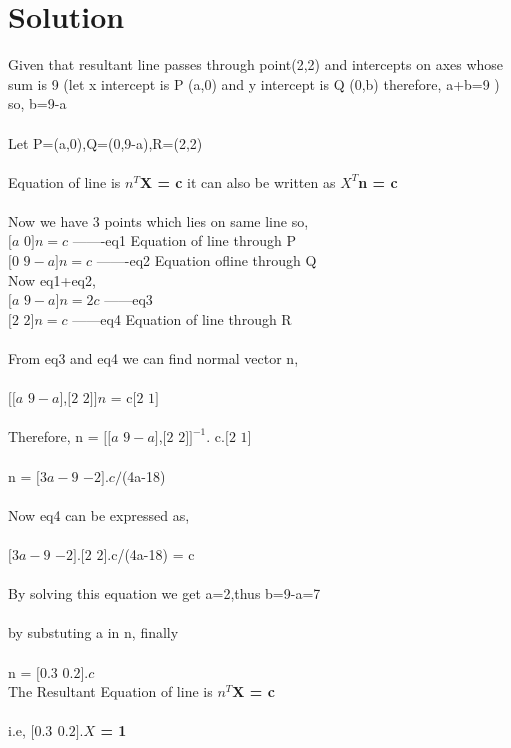 \documentclass[journal,12pt,twocolumn]{IEEEtran}
\begin{document}
\section{Solution}
Given that resultant line passes through point(2,2) and intercepts on axes whose sum is 9 (let x intercept is P (a,0) and y intercept is Q (0,b) therefore, a+b=9 ) so, b=9-a  \\
\\
Let P=(a,0),Q=(0,9-a),R=(2,2)\\
\\
Equation of line is \textbf{$n^{T}$X = c} it can also be written as \textbf{$X^{T}$n = c}\\
\\
Now we have 3 points which lies on same line so,\\
$[a$ $0]n = c$ -------eq1  Equation of line through P\\
$[0$ $9-a]n = c$ -------eq2 Equation ofline through Q\\
Now eq1+eq2,\\
$[a$ $9-a]n = 2c$ ------eq3 \\
$[2$ $2]n = c$ ------eq4 Equation of line through R\\
 \\
 From eq3 and eq4 we can find normal vector n,\\
 \\
 $[$$[a$ $9-a]$,$[2$ $2]$$]n$ = c$[2$ $1]$\\
 \\
 Therefore, n = $[$$[a$ $9-a]$,$[2$ $2]$$]^{-1}$. c.$[2$ $1]$\\
 \\
 n = $[3a-9$ $-2]. c/$(4a-18)\\
 \\
 Now eq4 can be expressed as,\\
 \\
  $[3a-9$ $-2]$.$[2$ $2]$.c/(4a-18) = c\\
  \\
  By solving this equation we get a=2,thus b=9-a=7\\
  \\
  by substuting a in n, finally\\
  \\
  n = $[0.3$ $0.2]. c$
  \\
The Resultant Equation of line is \textbf{$n^{T}$X = c} \\
\\
i.e,    \textbf{$[0.3$ $0.2]. X$ = 1}\\
\\
\end{document}
